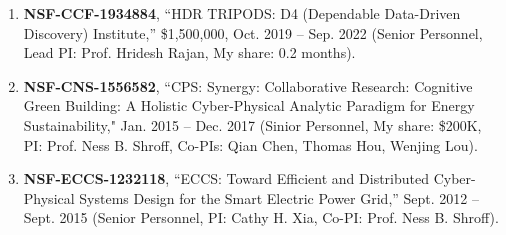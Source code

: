 \documentclass[overlapped,line,letterpaper]{res1}
\begin{document}
\begin{resume}
\begin{enumerate}
\vspace*{.08in}
\hspace{-.55in}  {\em D) Other Fundings (Senior Personnel)}

\vspace*{.08in} \item {\bf NSF-CCF-1934884}, ``HDR TRIPODS: D4 (Dependable Data-Driven Discovery) Institute,'' \$1,500,000, Oct. 2019 -- Sep. 2022 (Senior Personnel, Lead PI: Prof. Hridesh Rajan, My share: 0.2 months).

\vspace*{.08in} \item {\bf NSF-CNS-1556582}, ``CPS: Synergy: Collaborative Research: Cognitive Green Building: A Holistic Cyber-Physical Analytic Paradigm for Energy Sustainability," Jan. 2015 -- Dec. 2017 (Sinior Personnel, My share: \$200K, PI: Prof. Ness B. Shroff, Co-PIs: Qian Chen, Thomas Hou, Wenjing Lou).


\vspace*{.08in} \item {\bf NSF-ECCS-1232118}, ``ECCS: Toward Efficient and Distributed Cyber-Physical Systems Design for the Smart Electric Power Grid,'' Sept. 2012 -- Sept. 2015 (Senior Personnel, PI: Cathy H. Xia, Co-PI: Prof. Ness B. Shroff).


\end{enumerate}




\end{resume}
\end{document}
